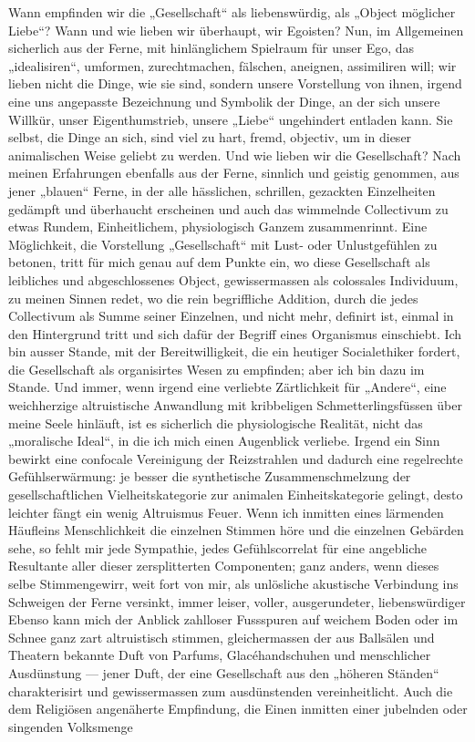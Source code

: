    Wann empfinden wir die „Gesellschaft“ als liebenswürdig, als „Object möglicher Liebe“? Wann und wie lieben wir überhaupt, wir Egoisten? Nun, im Allgemeinen sicherlich aus der Ferne, mit hinlänglichem Spielraum für unser Ego, das „idealisiren“, umformen, zurechtmachen, fälschen, aneignen, assimiliren will; wir lieben nicht die Dinge, wie sie sind, sondern unsere Vorstellung von ihnen, irgend eine uns angepasste Bezeichnung und Symbolik der Dinge, an der sich unsere Willkür, unser Eigenthumstrieb, unsere „Liebe“ ungehindert entladen kann. Sie selbst, die Dinge an sich, sind viel zu hart, fremd, objectiv, um in dieser animalischen Weise geliebt zu werden. Und wie lieben wir die Gesellschaft? Nach meinen Erfahrungen ebenfalls aus der Ferne, sinnlich und geistig genommen, aus jener „blauen“ Ferne, in der alle hässlichen, schrillen, gezackten Einzelheiten gedämpft und überhaucht erscheinen und auch das wimmelnde Collectivum zu etwas Rundem, Einheitlichem, physiologisch Ganzem zusammenrinnt. Eine Möglichkeit, die Vorstellung „Gesellschaft“ mit Lust- oder Unlustgefühlen zu betonen, tritt für mich genau auf dem Punkte ein, wo diese Gesellschaft als leibliches und abgeschlossenes Object, gewissermassen als colossales Individuum, zu meinen Sinnen redet, wo die rein begriffliche Addition, durch die jedes Collectivum als Summe seiner Einzelnen, und nicht mehr, definirt ist, einmal in den Hintergrund tritt und sich dafür der Begriff eines Organismus einschiebt. Ich bin ausser Stande, mit der Bereitwilligkeit, die ein heutiger Socialethiker fordert, die Gesellschaft  als organisirtes Wesen zu empfinden; aber ich bin  dazu im Stande. Und immer, wenn irgend eine verliebte Zärtlichkeit für „Andere“, eine weichherzige altruistische Anwandlung mit kribbeligen Schmetterlingsfüssen über meine Seele hinläuft, ist es sicherlich die physiologische Realität, nicht das „moralische Ideal“, in die ich mich einen Augenblick verliebe. Irgend ein Sinn bewirkt eine confocale Vereinigung der Reizstrahlen und dadurch eine regelrechte Gefühlserwärmung: je besser die synthetische Zusammenschmelzung der gesellschaftlichen Vielheitskategorie zur animalen Einheitskategorie gelingt, desto leichter fängt ein wenig Altruismus Feuer. Wenn ich inmitten eines lärmenden Häufleins Menschlichkeit die einzelnen Stimmen höre und die einzelnen Gebärden sehe, so fehlt mir jede Sympathie, jedes Gefühlscorrelat für eine angebliche Resultante aller dieser zersplitterten Componenten; ganz anders, wenn dieses selbe Stimmengewirr, weit fort von mir, als unlösliche akustische Verbindung ins Schweigen der Ferne versinkt, immer leiser, voller, ausgerundeter, liebenswürdiger  Ebenso kann mich der Anblick zahlloser Fussspuren auf weichem Boden oder im Schnee ganz zart altruistisch stimmen, gleichermassen der aus Ballsälen und Theatern bekannte Duft von Parfums, Glacéhandschuhen und menschlicher Ausdünstung — jener Duft, der eine Gesellschaft aus den „höheren Ständen“ charakterisirt und gewissermassen zum ausdünstenden  vereinheitlicht. Auch die dem Religiösen angenäherte Empfindung, die Einen inmitten einer jubelnden oder singenden Volksmenge 